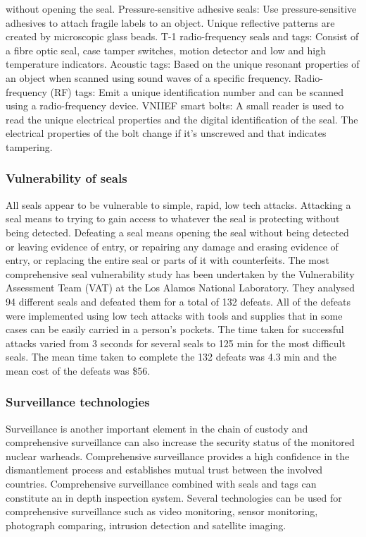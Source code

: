 \documentclass[twocolumn,a4paper]{article}
\begin{document}
without opening the seal.  Pressure-sensitive adhesive seals: Use
pressure-sensitive adhesives to attach fragile labels to an
object. Unique reflective patterns are created by microscopic glass
beads.  T-1 radio-frequency seals and tags: Consist of a fibre optic
seal, case tamper switches, motion detector and low and high
temperature indicators.  Acoustic tags: Based on the unique resonant
properties of an object when scanned using sound waves of a specific
frequency.  Radio-frequency (RF) tags: Emit a unique identification
number and can be scanned using a radio-frequency device.  VNIIEF
smart bolts: A small reader is used to read the unique electrical
properties and the digital identification of the seal. The electrical
properties of the bolt change if it’s unscrewed and that indicates
tampering.

\subsubsection{Vulnerability of seals}
All seals appear to be vulnerable to simple, rapid, low tech
attacks. Attacking a seal means to trying to gain access to whatever
the seal is protecting without being detected. Defeating a seal means
opening the seal without being detected or leaving evidence of entry,
or repairing any damage and erasing evidence of entry, or replacing
the entire seal or parts of it with counterfeits. The most
comprehensive seal vulnerability study has been undertaken by the
Vulnerability Assessment Team (VAT) at the Los Alamos National
Laboratory. They analysed 94 different seals and defeated them for a
total of 132 defeats. All of the defeats were implemented using low
tech attacks with tools and supplies that in some cases can be easily
carried in a person’s pockets. The time taken for successful attacks
varied from 3 seconds for several seals to 125 min for the most
difficult seals. The mean time taken to complete the 132 defeats was
4.3 min and the mean cost of the defeats was \$56. \citep{vulnSecSeals1997}

\subsubsection{Surveillance technologies}
Surveillance is another important element in the chain of custody and
comprehensive surveillance can also increase the security status of
the monitored nuclear warheads. Comprehensive surveillance provides a
high confidence in the dismantlement process and establishes mutual
trust between the involved countries. Comprehensive surveillance
combined with seals and tags can constitute an in depth inspection
system. Several technologies can be used for comprehensive
surveillance such as video monitoring, sensor monitoring, photograph
comparing, intrusion detection and satellite
imaging. \citep{wuwen2004}
\end{document}
